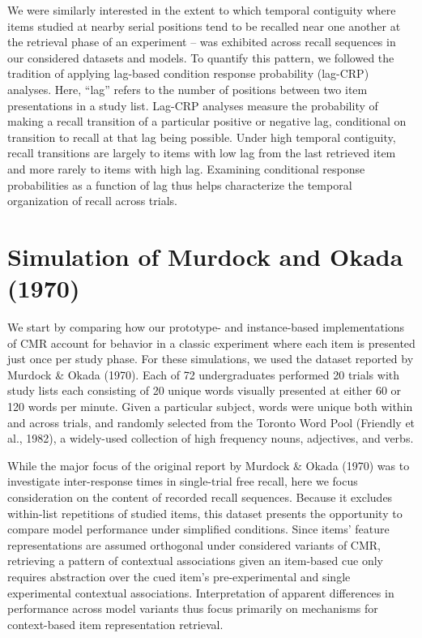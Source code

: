 \documentclass[
  letterpaper,
]{article}
\begin{document}
We were similarly interested in the extent to which temporal contiguity
where items studied at nearby serial positions tend to be recalled near
one another at the retrieval phase of an experiment -- was exhibited
across recall sequences in our considered datasets and models. To
quantify this pattern, we followed the tradition of applying lag-based
condition response probability (lag-CRP) analyses. Here, ``lag'' refers
to the number of positions between two item presentations in a study
list. Lag-CRP analyses measure the probability of making a recall
transition of a particular positive or negative lag, conditional on
transition to recall at that lag being possible. Under high temporal
contiguity, recall transitions are largely to items with low lag from
the last retrieved item and more rarely to items with high lag.
Examining conditional response probabilities as a function of lag thus
helps characterize the temporal organization of recall across trials.

\hypertarget{simulation-of-murdock-and-okada-1970}{%
\section{Simulation of Murdock and Okada
(1970)}\label{simulation-of-murdock-and-okada-1970}}

We start by comparing how our prototype- and instance-based
implementations of CMR account for behavior in a classic experiment
where each item is presented just once per study phase. For these
simulations, we used the dataset reported by Murdock \& Okada (1970).
Each of 72 undergraduates performed 20 trials with study lists each
consisting of 20 unique words visually presented at either 60 or 120
words per minute. Given a particular subject, words were unique both
within and across trials, and randomly selected from the Toronto Word
Pool (Friendly et al., 1982), a widely-used collection of high frequency
nouns, adjectives, and verbs.

While the major focus of the original report by Murdock \& Okada (1970)
was to investigate inter-response times in single-trial free recall,
here we focus consideration on the content of recorded recall sequences.
Because it excludes within-list repetitions of studied items, this
dataset presents the opportunity to compare model performance under
simplified conditions. Since items' feature representations are assumed
orthogonal under considered variants of CMR, retrieving a pattern of
contextual associations given an item-based cue only requires
abstraction over the cued item's pre-experimental and single
experimental contextual associations. Interpretation of apparent
differences in performance across model variants thus focus primarily on
mechanisms for context-based item representation retrieval.
\end{document}

